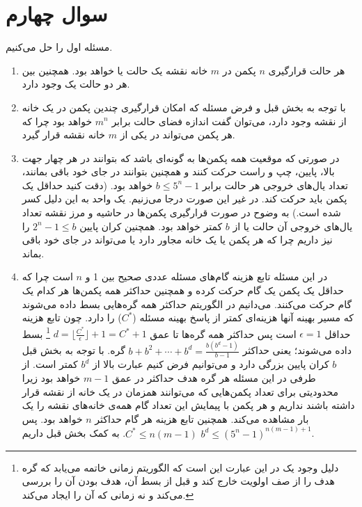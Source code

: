 \documentclass{article}
\begin{document}
	\section*{
		سوال چهارم
	}
	مسئله اول را حل می‌‌کنیم.
	\begin{enumerate}
		\item 
		هر حالت قرارگیری $n$ پکمن در $m$ خانه نقشه یک حالت یا 
		خواهد بود. همچنین بین هر دو حالت 
		یک 
		وجود دارد.
		\item 
		با توجه به بخش قبل و فرض مسئله که امکان قرارگیری چندین پکمن در یک خانه از نقشه وجود دارد، می‌توان گفت اندازه فضای حالت برابر 
		$m^n$
		خواهد بود چرا که هر پکمن می‌تواند در یکی از $m$ خانه نقشه قرار گیرد.
		\item 
		در صورتی که موقعیت همه پکمن‌ها به گونه‌ای باشد که بتوانند در هر چهار جهت بالا، پایین، چپ و راست حرکت کنند و همچنین بتوانند در جای خود باقی بمانند، تعداد یال‌های خروجی هر حالت برابر 
		$b \leq 5^n - 1$
		خواهد بود. (دقت کنید حداقل یک پکمن باید حرکت کند. در غیر این صورت درجا می‌زنیم. یک واحد به این دلیل کسر شده است.) به وضوح در صورت قرارگیری پکمن‌ها در حاشیه و مرز نقشه تعداد یال‌های خروجی آن حالت یا 
		از $b$ کمتر خواهد بود. همچنین کران پایین 
		$2^n - 1 \leq b$
		را نیز داریم چرا که هر پکمن یا یک خانه مجاور دارد یا می‌تواند در جای خود باقی بماند.
		\item 
		در این مسئله تابع هزینه گام‌های مسئله 
		عددی صحیح بین 1 و $n$ است چرا که حداقل یک پکمن یک گام حرکت کرده و همچنین حداکثر همه پکمن‌ها هر کدام یک گام حرکت می‌کنند. می‌دانیم در الگوریتم
حداکثر همه گره‌هایی بسط داده می‌شوند که مسیر بهینه آنها هزینه‌ای کمتر از پاسخ بهینه مسئله ($ C^* $) را دارد. چون تابع هزینه حداقل $\epsilon = 1$ است پس حداکثر همه گره‌ها تا عمق 
$d = \lfloor\frac{C^*}{\epsilon}\rfloor + 1 = C^* + 1$
\footnote{
دلیل وجود یک در این عبارت این است که الگوریتم 
زمانی خاتمه می‌یابد که گره هدف را از صف اولویت خارج کند و قبل از بسط آن، هدف بودن آن را بررسی می‌کند و نه زمانی که آن را ایجاد می‌کند.
}
بسط داده می‌شوند؛ یعنی حداکثر
$b + b^2 + \cdots + b^d = \frac{b(b^{d} - 1)}{b - 1}$
گره. با توجه به بخش قبل $b$ کران پایین بزرگی دارد و می‌توانیم فرض کنیم عبارت بالا از 
$b^d$
کمتر است. از طرفی در این مسئله هر گره هدف حداکثر در عمق 
$m - 1$
خواهد بود زیرا محدودیتی برای تعداد پکمن‌هایی که می‌توانند همزمان در یک خانه از نقشه قرار داشته باشند نداریم و هر پکمن با پیمایش این تعداد گام همه‌ی خانه‌های نقشه را یک بار مشاهده می‌کند. همچنین تابع هزینه هر گام حداکثر $n$ خواهد بود. پس 
$C^* \leq n (m-1)$.
به کمک بخش قبل داریم 
$b^d \leq (5^n - 1)^{n (m-1) + 1}$.
		

\end{enumerate}
\end{document}
